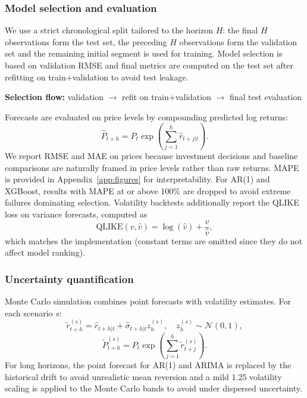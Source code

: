 \documentclass[11pt,a4paper]{article}
\begin{document}
\subsubsection{Model selection and evaluation}
We use a strict chronological split tailored to the horizon $H$: the final $H$ observations form the test set, the preceding $H$ observations form the validation set and the remaining initial segment is used for training. Model selection is based on validation RMSE and final metrics are computed on the test set after refitting on train+validation to avoid test leakage.
\begin{center}
\small\textbf{Selection flow:} validation $\rightarrow$ refit on train+validation $\rightarrow$ final test evaluation
\end{center}
Forecasts are evaluated on price levels by compounding predicted log returns:
\begin{equation}
\hat P_{t+h} = P_t \exp\left(\sum_{j=1}^{h}\hat r_{t+j|t}\right).
\end{equation}
We report RMSE and MAE on prices because investment decisions and baseline comparisons are naturally framed in price levels rather than raw returns. MAPE is provided in Appendix~\ref{app:figures} for interpretability. For AR(1) and XGBoost, results with MAPE at or above 100\% are dropped to avoid extreme failures dominating selection. Volatility backtests additionally report the QLIKE loss on variance forecasts, computed as
\begin{equation}
\mathrm{QLIKE}(v,\hat v) = \log(\hat v) + \frac{v}{\hat v},
\end{equation}
which matches the implementation (constant terms are omitted since they do not affect model ranking).

\subsubsection{Uncertainty quantification}
Monte Carlo simulation combines point forecasts with volatility estimates. For each scenario $s$:
\begin{equation}
\tilde r^{(s)}_{t+h} = \hat r_{t+h|t} + \hat\sigma_{t+h|t} z_h^{(s)}, \quad z_h^{(s)} \sim \mathcal{N}(0,1),
\end{equation}
\begin{equation}
\tilde P^{(s)}_{t+h} = P_t \exp\left(\sum_{j=1}^{h} \tilde r^{(s)}_{t+j}\right).
\end{equation}
For long horizons, the point forecast for AR(1) and ARIMA is replaced by the historical drift to avoid unrealistic mean reversion and a mild 1.25 volatility scaling is applied to the Monte Carlo bands to avoid under dispersed uncertainty.
\end{document}
